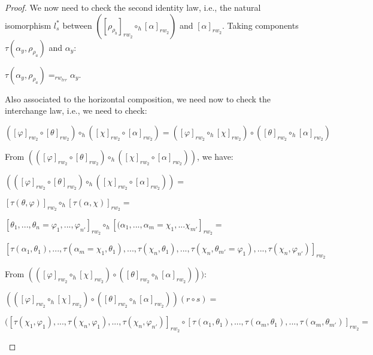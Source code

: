 \documentclass[12pt, a4paper,  oneside, headinclude,footinclude, BCOR5mm]{scrartcl}
\begin{document}
\begin{proof}
We now need to check the second identity law, i.e., the natural isomorphism $l^{*}_{s}$ between  $( [\rho_{\rho_{b}}]_{rw_{2}} \circ_{h} [\alpha]_{rw_{2}})$ and $[\alpha]_{rw_{2}}$. Taking components $\tau(\alpha_{y}, \rho_{\rho_{a}})$ and $\alpha_{y}$:

\begin{center}
$\tau(\alpha_{y}, \rho_{\rho_{a}}) =_{rw_{trr}} \alpha_{y}$.
\end{center}

Also associated to the horizontal composition, we need now to check the interchange law, i.e., we need to check:

\begin{center}
$([\varphi]_{rw_{2}} \circ [\theta]_{rw_{2}}) \circ_{h} ([\chi]_{rw_{2}} \circ [\alpha]_{rw_{2}}) = ([\varphi]_{rw_{2}} \circ_{h} [\chi]_{rw_{2}}) \circ ([\theta]_{rw_{2}} \circ_{h} [\alpha]_{rw_{2}})$
\end{center}

From  $(([\varphi]_{rw_{2}} \circ [\theta]_{rw_{2}}) \circ_{h} ([\chi]_{rw_{2}} \circ [\alpha]_{rw_{2}}))$, we have:

\begin{center}
 $(([\varphi]_{rw_{2}} \circ [\theta]_{rw_{2}}) \circ_{h} ([\chi]_{rw_{2}} \circ [\alpha]_{rw_{2}})) =$

 $[\tau(\theta, \varphi)]_{rw_{2}} \circ_{h} [\tau(\alpha, \chi)]_{rw_{2}}=$

$[\theta_{1}, ..., \theta_{n} = \varphi_{1}, ..., \varphi_{n'}]_{rw_{2}} \circ_{h} [(\alpha_{1}, ..., \alpha_{m} = \chi_{1}, ... \chi_{m'}]_{rw_{2}} = $

$[\tau(\alpha_{1}, \theta_{1}),..., \tau(\alpha_{m} = \chi_{1}, \theta_{1}), ..., \tau(\chi_{n},\theta_{1}), ..., \tau(\chi_{n},\theta_{m'} = \varphi_{1}),..., \tau(\chi_{n},\varphi_{n'})]_{rw_{2}}$
\end{center}

From   $(([\varphi]_{rw_{2}} \circ_{h} [\chi]_{rw_{2}}) \circ ([\theta]_{rw_{2}} \circ_{h} [\alpha]_{rw_{2}})))$:

\begin{center}
 $(([\varphi]_{rw_{2}} \circ_{h} [\chi]_{rw_{2}}) \circ ([\theta]_{rw_{2}} \circ_{h} [\alpha]_{rw_{2}}))(r \circ s) =$

 $([\tau(\chi_{1}, \varphi_{1}),...,\tau(\chi_{n},\varphi_{1}),...,\tau(\chi_{n},\varphi_{n'})]_{rw_{2}} \circ [\tau(\alpha_{1},\theta_{1}),...,\tau(\alpha_{m},\theta_{1}),...,\tau(\alpha_{m},\theta_{m'})]_{rw_{2}} = $


\end{center}
\end{proof}
\end{document}
